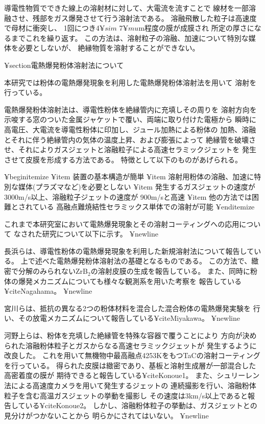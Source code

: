 	導電性物質でできた線上の溶射材に対して、大電流を流すことで
	線材を一部溶融させ、残部をガス爆発させて行う溶射法である。
	溶融飛散した粒子は高速度で母材に衝突し、
	1回につき4$¥sim $ 7$¥mu$m程度の膜が成膜され
	所定の厚さになるまでこれを繰り返す。
	この方法は、溶射粒子の溶融、加速について特別な媒体を必要としないが、
	絶縁物質を溶射することができない。
	

¥section{電熱爆発粉体溶射法について}

本研究では粉体の電熱爆発現象を利用した電熱爆発粉体溶射法を用いて
溶射を行っている。

電熱爆発粉体溶射法は、導電性粉体を絶縁管内に充填しその周りを
溶射方向を示唆する窓のついた金属ジャケットで覆い、両端に取り付けた電極から
瞬時に高電圧、大電流を導電性粉体に印加し、ジュール加熱による粉体の
加熱、溶融とそれに伴う絶縁管内の気体の温度上昇、および膨張によって
絶縁管を破壊させ、それによりガスジェットと溶融粒子による高速セラミックジェットを
発生させて皮膜を形成する方法である。
特徴として以下のものがあげられる。

¥begin{itemize}
	¥item 装置の基本構造が簡単
	¥item 溶射用粉体の溶融、加速に特別な媒体(プラズマなど)を必要としない
	¥item 発生するガスジェットの速度が3000m/s以上、溶融粒子ジェットの速度が
	900m/sと高速
	¥item 他の方法では困難とされている
	高融点難焼結性セラミックス単体での溶射が可能
¥end{itemize}

これまで本研究室において電熱爆発現象とその溶射コーティングへの応用について
なされた研究について以下に示す。
¥newline

長浜らは、導電性粉体の電熱爆発現象を利用した新規溶射法について報告している。
上で述べた電熱爆発粉体溶射法の基礎となるものである。
この方法で、緻密で分解のみられないZrB$_2$の溶射皮膜の生成を報告している。
また、同時に粉体の爆発メカニズムについても様々な観測系を用いた考察を
報告している¥cite{Nagahama}。
¥newline

宮川らは、抵抗の異なる2つの粉体材料を混合した混合粉体の電熱爆発実験を
行い、その放電メカニズムについて報告している¥cite{Miyakawa}。
¥newline

河野上らは、粉体を充填した絶縁管を特殊な容器で覆うことにより
方向が決められた溶融粉体粒子とガスからなる高速セラミックジェットが
発生するように改良した。
これを用いて無機物中最高融点4253KをもつTaCの溶射コーティングを行っている。
得られた皮膜は緻密であり、基板と溶射生成層が一部混合した高密着度の膜が
期待できると報告している¥cite{Konoue1}。
また、シュリーレン法による高速度カメラを用いて発生するジェットの
連続撮影を行い、溶融粉体粒子を含む高温ガスジェットの挙動を撮影し
その速度は3km/s以上であると報告している¥cite{Konoue2}。
しかし、溶融粉体粒子の挙動は、ガスジェットとの見分けがつかないことから
明らかにされてはいない。
¥newline

